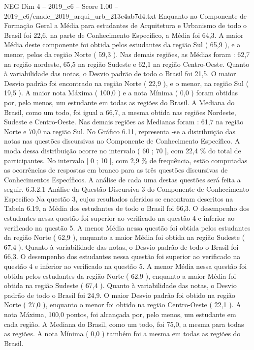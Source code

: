 \begin{textsample}{NEG Dim 4 – 2019\_c6 – Score 1.00 – 2019\_c6/enade\_2019\_arqui\_urb\_213c4ab7d4.txt}
Enquanto no Componente de Formação Geral a Média para estudantes de Arquitetura e Urbanismo de todo o Brasil foi 22,6, na parte de Conhecimento Específico, a Média foi 64,3.
A maior Média deste componente foi obtida pelos estudantes da região Sul ( 65,9 ), e a menor, pelos da região Norte ( 59,3 ).
Nas demais regiões, as Médias foram : 62,7 na região nordeste, 65,5 na região Sudeste e 62,1 na região Centro-Oeste.
Quanto à variabilidade das notas, o Desvio padrão de todo o Brasil foi 21,5.
O maior Desvio padrão foi encontrado na região Norte ( 22,9 ), e o menor, na região Sul ( 19,5 ).
A maior nota Máxima ( 100,0 ) e a nota Mínima ( 0,0 ) foram obtidas por, pelo menos, um estudante em todas as regiões do Brasil.
A Mediana do Brasil, como um todo, foi igual a 66,7, a mesma obtida nas regiões Nordeste, Sudeste e Centro-Oeste.
Nas demais regiões as Medianas foram : 61,7 na região Norte e 70,0 na região Sul.
No Gráfico 6.11, representa -se a distribuição das notas nas questões discursivas no Componente de Conhecimento Específico.
A moda dessa distribuição ocorre no intervalo ( 60 ; 70 ], com 22,4 \% do total de participantes.
No intervalo [ 0 ; 10 ], com 2,9 \% de frequência, estão computadas as ocorrências de respostas em branco para as três questões discursivas de Conhecimentos Específicos.
A análise de cada uma destas questões será feita a seguir. 6.3.2.1 Análise da Questão Discursiva 3 do Componente de Conhecimento Específico Na questão 3, cujos resultados aferidos se encontram descritos na Tabela 6.19, a Média dos estudantes de todo o Brasil foi 66,3.
O desempenho dos estudantes nessa questão foi superior ao verificado na questão 4 e inferior ao verificado na questão 5.
A menor Média nessa questão foi obtida pelos estudantes da região Norte ( 62,9 ), enquanto a maior Média foi obtida na região Sudeste ( 67,4 ).
Quanto à variabilidade das notas, o Desvio padrão de todo o Brasil foi 66,3.
O desempenho dos estudantes nessa questão foi superior ao verificado na questão 4 e inferior ao verificado na questão 5.
A menor Média nessa questão foi obtida pelos estudantes da região Norte ( 62,9 ), enquanto a maior Média foi obtida na região Sudeste ( 67,4 ).
Quanto à variabilidade das notas, o Desvio padrão de todo o Brasil foi 24,9.
O maior Desvio padrão foi obtido na região Norte ( 27,0 ), enquanto o menor foi obtido na região Centro-Oeste ( 22,1 ).
A nota Máxima, 100,0 pontos, foi alcançada por, pelo menos, um estudante em cada região.
A Mediana do Brasil, como um todo, foi 75,0, a mesma para todas as regiões.
A nota Mínima ( 0,0 ) também foi a mesma em todas as regiões do Brasil.

\end{textsample}
